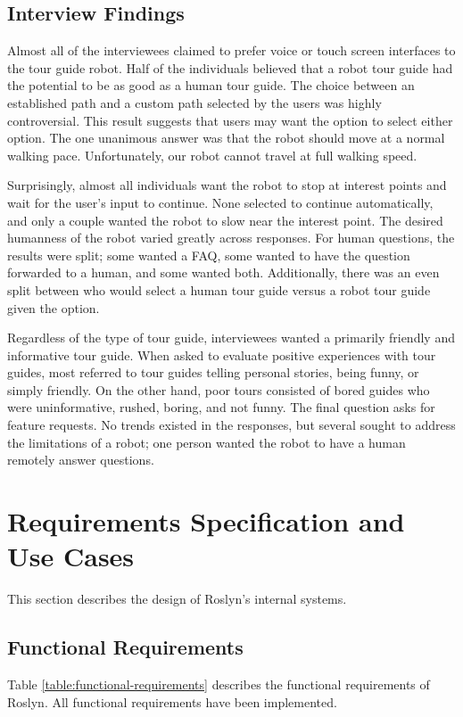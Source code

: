 \documentclass[11pt]{report}
\begin{document}
\subsection{Interview Findings}
Almost all of the interviewees claimed to prefer voice or touch screen interfaces to the tour guide robot. Half of the individuals believed that a robot tour guide had the potential to be as good as a human tour guide. The choice between an established path and a custom path selected by the users was highly controversial. This result suggests that users may want the option to select either option. The one unanimous answer was that the robot should move at a normal walking pace. Unfortunately, our robot cannot travel at full walking speed. 

Surprisingly, almost all individuals want the robot to stop at interest points and wait for the user’s input to continue. None selected to continue automatically, and only a couple wanted the robot to slow near the interest point. The desired humanness of the robot varied greatly across responses. For human questions, the results were split; some wanted a FAQ, some wanted to have the question forwarded to a human, and some wanted both. Additionally, there was an even split between who would select a human tour guide versus a robot tour guide given the option. 

Regardless of the type of tour guide, interviewees wanted a primarily friendly and informative tour guide. When asked to evaluate positive experiences with tour guides, most referred to tour guides telling personal stories, being funny, or simply friendly. On the other hand, poor tours consisted of bored guides who were uninformative, rushed, boring, and not funny. The final question asks for feature requests. No trends existed in the responses, but several sought to address the limitations of a robot; one person wanted the robot to have a human remotely answer questions.

\section{Requirements Specification and Use Cases}
This section describes the design of Roslyn’s internal systems.
\subsection{Functional Requirements}
Table \ref{table:functional-requirements} describes the functional requirements of Roslyn. All functional requirements have been implemented.
\end{document}
